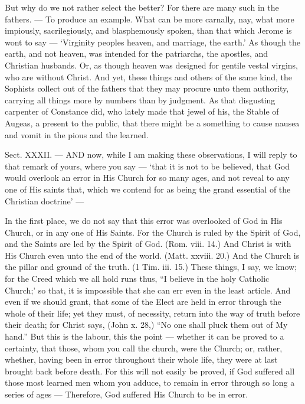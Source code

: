 But why do we not rather select the better? For there are many such in the fathers. — To produce an example. What can be more carnally, nay, what more impiously, sacrilegiously, and blasphemously spoken, than that which Jerome is wont to say — ‘Virginity peoples heaven, and marriage, the earth.’ As though the earth, and not heaven, was intended for the patriarchs, the apostles, and Christian husbands. Or, as though heaven was designed for gentile vestal virgins, who are without Christ. And yet, these things and others of the same kind, the Sophists collect out of the fathers that they may procure unto them authority, carrying all things more by numbers than by judgment. As that disgusting carpenter of Constance did, who lately made that jewel of his, the Stable of Augeas, a present to the public, that there might be a something to cause nausea and vomit in the pious and the learned.


Sect. XXXII. — AND now, while I am making these observations, I will reply to that remark of yours, where you say — ‘that it is not to be believed, that God would overlook an error in His Church for so many ages, and not reveal to any one of His saints that, which we contend for as being the grand essential of the Christian doctrine’ —

In the first place, we do not say that this error was overlooked of God in His Church, or in any one of His Saints. For the Church is ruled by the Spirit of God, and the Saints are led by the Spirit of God. (Rom. viii. 14.) And Christ is with His Church even unto the end of the world. (Matt. xxviii. 20.) And the Church is the pillar and ground of the truth. (1 Tim. iii. 15.) These things, I say, we know; for the Creed which we all hold runs thus, “I believe in the holy Catholic Church;’ so that, it is impossible that she can err even in the least article. And even if we should grant, that some of the Elect are held in error through the whole of their life; yet they must, of necessity, return into the way of truth before their death; for Christ says, (John x. 28,) “No one shall pluck them out of My hand.” But this is the labour, this the point — whether it can be proved to a certainty, that those, whom you call the church, were the Church; or, rather, whether, having been in error throughout their whole life, they were at last brought back before death. For this will not easily be proved, if God suffered all those most learned men whom you adduce, to remain in error through so long a series of ages — Therefore, God suffered His Church to be in error.

